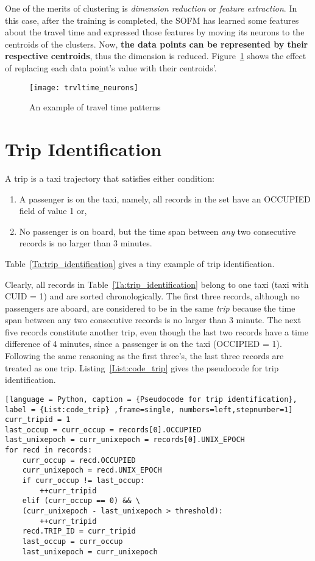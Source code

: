 One of the merits of clustering is \emph{dimension reduction} or \emph{feature extraction}. In this case, after the training is completed, the SOFM has learned some features about the travel time and expressed those features by moving its neurons to the centroids of the clusters. Now, \textbf{the data points can be represented by their respective centroids}, thus the dimension is reduced. Figure~\ref{Fig:trvltime_neurons} shows the effect of replacing each data point's value with their centroids'. 

\begin{figure}[h!]
\texttt{[image: trvltime\_neurons]}
\centering
\caption{An example of travel time patterns}\label{Fig:trvltime_neurons}
\end{figure}

\section{Trip Identification}
\begin{defn}\label{Def:trip}
A trip is a taxi trajectory that satisfies either condition:
\begin{enumerate}
\item A passenger is on the taxi, namely, all records in the set have an OCCUPIED field of value 1 or, 
\item No passenger is on board, but the time span between \emph{any} two consecutive records is no larger than 3 minutes.
\end{enumerate}
\end{defn}

Table~\ref{Ta:trip_identification} gives a tiny example of trip identification.



Clearly, all records in Table~\ref{Ta:trip_identification} belong to one taxi (taxi with CUID = 1) and are sorted chronologically. The first three records, although no passengers are aboard, are considered to be in the same \emph{trip} because the time span between any two consecutive records is no larger than 3 minute. The next five records constitute another trip, even though the last two records have a time difference of 4 minutes, since a passenger is on the taxi (OCCIPIED = 1). Following the same reasoning as the first three's, the last three records are treated as one trip. Listing~\ref{List:code_trip} gives the pseudocode for trip identification.

\begin{lstlisting}[language = Python, caption = {Pseudocode for trip identification}, label = {List:code_trip} ,frame=single, numbers=left,stepnumber=1]
curr_tripid = 1
last_occup = curr_occup = records[0].OCCUPIED
last_unixepoch = curr_unixepoch = records[0].UNIX_EPOCH
for recd in records:
	curr_occup = recd.OCCUPIED
	curr_unixepoch = recd.UNIX_EPOCH
	if curr_occup != last_occup:
		++curr_tripid
	elif (curr_occup == 0) && \
	(curr_unixepoch - last_unixepoch > threshold):
		++curr_tripid
	recd.TRIP_ID = curr_tripid
	last_occup = curr_occup
	last_unixepoch = curr_unixepoch
\end{lstlisting}

